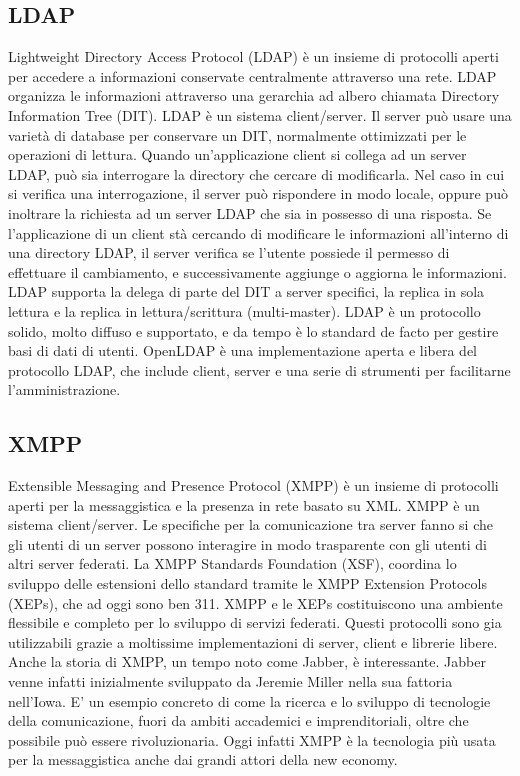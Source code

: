 \subsection{LDAP}
Lightweight Directory Access Protocol (LDAP) è un insieme di
protocolli aperti per accedere a informazioni conservate centralmente
attraverso una rete. LDAP organizza le informazioni attraverso una
gerarchia ad albero chiamata Directory Information Tree (DIT). LDAP è
un sistema client/server. Il server può usare una varietà di database
per conservare un DIT, normalmente ottimizzati per le operazioni di
lettura. Quando un'applicazione client si collega ad un server LDAP,
può sia interrogare la directory che cercare di modificarla. Nel caso
in cui si verifica una interrogazione, il server può rispondere in
modo locale, oppure può inoltrare la richiesta ad un server LDAP che
sia in possesso di una risposta. Se l'applicazione di un client stà
cercando di modificare le informazioni all'interno di una directory
LDAP, il server verifica se l'utente possiede il permesso di
effettuare il cambiamento, e successivamente aggiunge o aggiorna le
informazioni. LDAP supporta la delega di parte del DIT a server
specifici, la replica in sola lettura e la replica in
lettura/scrittura (multi-master).  LDAP è un protocollo solido, molto
diffuso e supportato, e da tempo è lo standard de facto per gestire
basi di dati di utenti. OpenLDAP è una implementazione aperta e libera
del protocollo LDAP, che include client, server e una serie di
strumenti per facilitarne l'amministrazione.

\subsection{XMPP}
Extensible Messaging and Presence Protocol (XMPP) è un insieme di
protocolli aperti per la messaggistica e la presenza in rete basato su
XML. XMPP è un sistema client/server. Le specifiche per la
comunicazione tra server fanno si che gli utenti di un server possono
interagire in modo trasparente con gli utenti di altri server
federati. La XMPP Standards Foundation (XSF), coordina lo sviluppo
delle estensioni dello standard tramite le XMPP Extension Protocols
(XEPs), che ad oggi sono ben 311. XMPP e le XEPs costituiscono una
ambiente flessibile e completo per lo sviluppo di servizi
federati. Questi protocolli sono gia utilizzabili grazie a moltissime
implementazioni di server, client e librerie libere. Anche la storia
di XMPP, un tempo noto come Jabber, è interessante. Jabber venne
infatti inizialmente sviluppato da Jeremie Miller nella sua fattoria
nell'Iowa. E' un esempio concreto di come la ricerca e lo sviluppo di
tecnologie della comunicazione, fuori da ambiti accademici e
imprenditoriali, oltre che possibile può essere rivoluzionaria. Oggi
infatti XMPP è la tecnologia più usata per la messaggistica anche dai
grandi attori della new economy.


